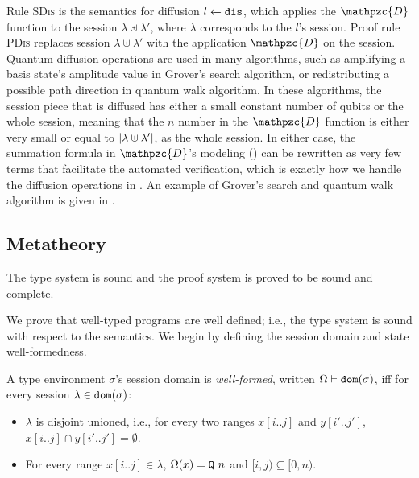Rule \textsc{SDis} is the semantics for diffusion ${l} \xleftarrow{} {\texttt{dis}}$, which applies the $\mathpzc{D}$ function to the session $\lambda \uplus \lambda'$, where $\lambda$ corresponds to the $l$'s session. Proof rule \textsc{PDis} replaces session $\lambda\uplus \lambda'$ with the application $\mathpzc{D}$ on the session.
Quantum diffusion operations are used in many algorithms, such as amplifying a basis state's amplitude value in Grover's search algorithm, or redistributing a possible path direction in quantum walk algorithm.
In these algorithms, the session piece that is diffused has either a small constant number of qubits or the whole session, meaning that the $n$ number in the $\mathpzc{D}$ function is either very small or equal to $|\lambda \uplus \lambda'|$, as the whole session.
In either case, the summation formula in $\mathpzc{D}$'s modeling () can be rewritten as very few terms that facilitate the automated verification, which is exactly how we handle the diffusion operations in \qafny.
An example of Grover's search and quantum walk algorithm is given in .

\subsection{\qafny Metatheory}\label{sec:theorems}

The type system is sound and the proof system is proved to be sound and complete.


We prove that well-typed \qafny programs are well defined; i.e., the
type system is sound with respect to the semantics. 
We begin by defining the session domain and state well-formedness.

\begin{definition}\label{def:well-formed-ses}\rm 
  A type environment $\sigma$'s session domain is \emph{well-formed}, written
  $\Omega \vdash \mathtt{dom}(\sigma)$, iff for every session $\lambda\in \mathtt{dom}(\sigma)$:
\begin{itemize}
\item $\lambda$ is disjoint unioned, i.e., for every two ranges $x[i..j]$ and $y[i'..j']$, $x[i..j]\cap y[i'..j']=\emptyset$.

\item For every range $x[i..j]\in\lambda$, $\Omega(x)=\texttt{Q}~n$ and $[i,j) \subseteq [0,n)$.
\end{itemize}
\end{definition}

